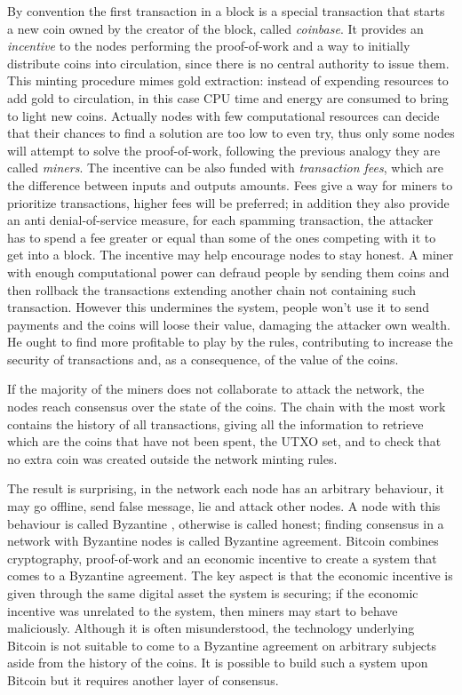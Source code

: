 By convention the first transaction in a block is a special transaction that starts a new coin owned by the creator of the block, called \textit{coinbase}.
It provides an \textit{incentive} to the nodes performing the proof-of-work and a way to initially distribute coins into circulation, since there is no central authority to issue them.
This minting procedure mimes gold extraction: instead of expending resources to add gold to circulation, in this case CPU time and energy are consumed to bring to light new coins. 
Actually nodes with few computational resources can decide that their chances to find a solution are too low to even try, thus only some nodes will attempt to solve the proof-of-work, following the previous analogy they are called \textit{miners}.
The incentive can be also funded with \textit{transaction fees}, which are the difference between inputs and outputs amounts. Fees give a way for miners to prioritize transactions, higher fees will be preferred; in addition they also provide an anti denial-of-service measure, for each spamming transaction, the attacker has to spend a fee greater or equal than some of the ones competing with it to get into a block.
The incentive may help encourage nodes to stay honest. 
A miner with enough computational power can defraud people by sending them coins and then rollback the transactions extending another chain not containing such transaction. 
However this undermines the system, people won't use it to send payments and the coins will loose their value, damaging the attacker own wealth.
He ought to find more profitable to play by the rules, contributing to increase the security of transactions and, as a consequence, of the value of the coins.

If the majority of the miners does not collaborate to attack the network, the nodes reach consensus over the state of the coins. The chain with the most work contains the history of all transactions, giving all the information to retrieve which are the coins that have not been spent, the UTXO set, and to check that no extra coin was created outside the network minting rules.
 
The result is surprising, in the network each node has an arbitrary behaviour, it may go offline, send false message, lie and attack other nodes. A node with this behaviour is called Byzantine \cite{Wattenhofer:2016:SB:3002702}, otherwise is called honest; 
finding consensus in a network with Byzantine nodes is called Byzantine agreement.
Bitcoin combines cryptography, proof-of-work and an economic incentive to create a system that comes to a Byzantine agreement. 
The key aspect is that the economic incentive is given through the same digital asset the system is securing; if the economic incentive was unrelated to the system, then miners may start to behave maliciously.
Although it is often misunderstood, the technology underlying Bitcoin is not suitable to come to a Byzantine agreement on arbitrary subjects aside from the history of the coins. It is possible to build such a system upon Bitcoin but it requires another layer of consensus.

